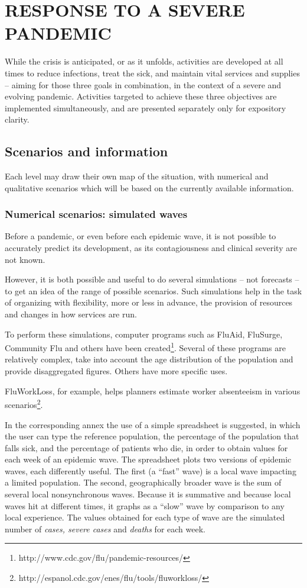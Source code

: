\documentclass[12pt, a4]{scrartcl}
\begin{document}
\section{RESPONSE TO A SEVERE PANDEMIC}
While the crisis is anticipated, or as it unfolds, activities are developed at all times to reduce infections, treat the sick, and maintain vital services and supplies – aiming for those three goals in combination, in the context of a severe and evolving pandemic. Activities targeted to achieve these three objectives are implemented simultaneously, and are
presented separately only for expository clarity.

\subsection{Scenarios and information}
Each level may draw their own map of the situation, with numerical and qualitative scenarios which will be based on the currently available information.
\subsubsection{Numerical scenarios: simulated waves}
Before a pandemic, or even before each epidemic wave, it is not possible to accurately predict its development, as its contagiousness and clinical severity are not known.

However, it is both possible and useful to do several simulations – not forecasts – to get an idea of the range of possible scenarios. Such simulations help in the task of organizing with flexibility, more or less in advance, the provision of resources and changes in how services are run.

To perform these simulations, computer programs such as FluAid, FluSurge, Community Flu and others have been created\footnote{http://www.cdc.gov/flu/pandemic-resources/}. Several of these programs are relatively complex, take into account the age distribution of the population and provide disaggregated figures. Others have more specific uses.

FluWorkLoss, for example, helps planners estimate worker absenteeism in various scenarios\footnote{http://espanol.cdc.gov/enes/flu/tools/fluworkloss/}.

In the corresponding annex the use of a simple spreadsheet is suggested, in which the user can type the reference population, the percentage of the population that falls sick, and the percentage of patients who die, in order to obtain values for each week of an epidemic wave. The spreadsheet plots two versions of epidemic waves, each differently useful. The first (a “fast” wave) is a local wave impacting a limited population. The second, geographically broader wave is the sum of several local nonsynchronous waves. Because it is summative and because local waves hit at different times, it graphs as a “slow” wave by comparison to any local experience. The values obtained for each type of wave are the simulated number of \emph{cases, severe cases} and \emph{deaths} for each week.
\end{document}
